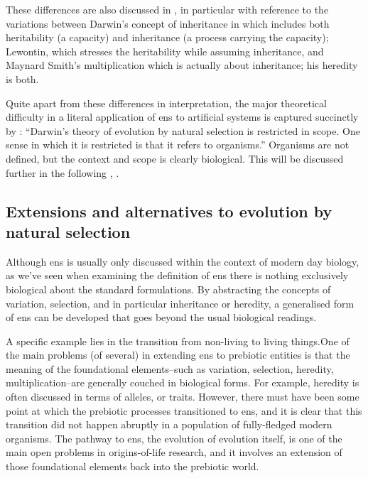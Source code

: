 These differences are also discussed in \parencite{Griesemer2001}, in particular with reference to the variations between Darwin's concept of inheritance in \cite{Darwin1859} which includes both heritability (a capacity) and inheritance (a process carrying the capacity); Lewontin, which stresses the heritability while assuming inheritance, and Maynard Smith's multiplication which is actually about inheritance; his heredity is both. \parencite{Griesemer2001}

Quite apart from these differences in interpretation, the major theoretical difficulty in a literal application of \gls{ens} to artificial systems is captured succinctly by \parencite{Griesemer2005}: ``Darwin's theory of evolution by natural selection is restricted in scope. One sense in which it is restricted is that it refers to organisms.'' Organisms are not defined, but the context and scope is clearly biological. This will be discussed further in the following , .

\subsection{Extensions and alternatives to evolution by natural selection}\label{alternatives-to-evolution-by-natural-selection}

Although \gls{ens} is usually only discussed within the context of modern day biology, as we've seen when examining the definition of \gls{ens} there is nothing exclusively biological about the standard formulations. By abstracting the concepts of variation, selection, and in particular inheritance or heredity, a generalised form of \gls{ens} can be developed that goes beyond the usual biological readings. 

A specific example lies in the transition from non-living to living things.One of the main problems (of several) in extending \gls{ens} to prebiotic entities is that the meaning of the foundational elements--such as variation, selection, heredity, multiplication--are generally couched in biological forms. For example, heredity is often discussed in terms of alleles, or traits. However, there must have been some point at which the prebiotic processes transitioned to \gls{ens}, and it is clear that this transition did not happen abruptly in a population of fully-fledged modern organisms. The pathway to \gls{ens}, the evolution of evolution itself, is one of the main open problems in origins-of-life research, and it involves an extension of those foundational elements back into the prebiotic world.

